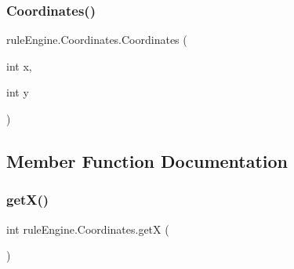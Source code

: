 \subsubsection{\texorpdfstring{Coordinates()}{Coordinates()}}
{\footnotesize\ttfamily rule\+Engine.\+Coordinates.\+Coordinates (\begin{DoxyParamCaption}\item[{int}]{x,  }\item[{int}]{y }\end{DoxyParamCaption})\hspace{0.3cm}{\ttfamily [inline]}}



\subsection{Member Function Documentation}
\mbox{\label{classrule_engine_1_1_coordinates_a2b3c0539db7bec01491eef738487b147}} 
\subsubsection{\texorpdfstring{get\+X()}{getX()}}
{\footnotesize\ttfamily int rule\+Engine.\+Coordinates.\+getX (\begin{DoxyParamCaption}{ }\end{DoxyParamCaption})\hspace{0.3cm}{\ttfamily [inline]}}

